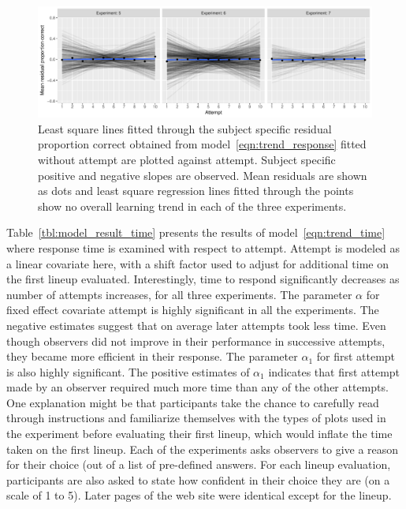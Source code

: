 \documentclass[10pt]{article}\usepackage[]{graphicx}\usepackage[]{xcolor}
\begin{document}
\begin{figure}[htbp] 
   \centering
    \includegraphics[width=6.3in]{learning_trend_subject.pdf} 
   \caption{ Least square lines fitted through the subject specific residual proportion correct obtained from model~\eqref{eqn:trend_response} fitted without attempt are plotted against attempt. Subject specific positive and negative slopes are observed. Mean residuals are shown as dots and least square regression lines fitted through the points show no overall learning trend in each of the three experiments.}
   \label{fig:learning_trend_response}
\end{figure}


Table~\ref{tbl:model_result_time} presents the results of model~\eqref{eqn:trend_time} where response time is examined with respect to attempt. Attempt is modeled as a linear covariate here, with a shift factor used to adjust for additional time on the first lineup evaluated. Interestingly, time to respond significantly decreases as number of attempts increases, for all three experiments. 
The parameter $\alpha$ for fixed effect covariate attempt is highly significant in all the experiments. The negative estimates suggest that on average later attempts took less time. Even though observers did not improve in their performance in successive attempts, they became more efficient in their response. The parameter $\alpha_1$ for first attempt is also highly significant. The positive estimates of $\alpha_1$ indicates that first attempt made by an observer required much more time than any of the other attempts. One explanation might be that participants take the chance to  carefully read through instructions and familiarize themselves  with the types of plots used in the experiment before evaluating their first lineup, which would inflate the time taken on the first lineup. Each of the experiments asks observers to give a reason for their choice (out of a list of pre-defined answers. For each lineup evaluation, participants are also asked to state how confident in their choice they are (on a scale of 1 to 5).  Later pages of the web site were identical  except for the lineup. 
\end{document}
